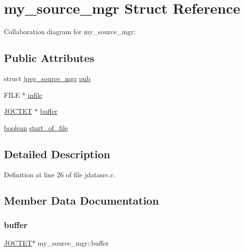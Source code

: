 \hypertarget{structmy__source__mgr}{}\section{my\+\_\+source\+\_\+mgr Struct Reference}
\label{structmy__source__mgr}


Collaboration diagram for my\+\_\+source\+\_\+mgr\+:
\subsection*{Public Attributes}
\begin{DoxyCompactItemize}
\item 
struct \mbox{\hyperlink{structjpeg__source__mgr}{jpeg\+\_\+source\+\_\+mgr}} \mbox{\hyperlink{structmy__source__mgr_a8572f33f87bec948592001edea12680f}{pub}}
\item 
F\+I\+LE $\ast$ \mbox{\hyperlink{structmy__source__mgr_a157a49dcdfd5723e566b1b8a35394a04}{infile}}
\item 
\mbox{\hyperlink{jmorecfg_8h_a356ad249f20e691b520da439f92cccbc}{J\+O\+C\+T\+ET}} $\ast$ \mbox{\hyperlink{structmy__source__mgr_ab92bf51a7ca44e0d3909aeb21fb0b0f8}{buffer}}
\item 
\mbox{\hyperlink{jmorecfg_8h_a7c6368b321bd9acd0149b030bb8275ed}{boolean}} \mbox{\hyperlink{structmy__source__mgr_a5c505c9008db53bb3ce07ed8ae3872a9}{start\+\_\+of\+\_\+file}}
\end{DoxyCompactItemize}


\subsection{Detailed Description}


Definition at line 26 of file jdatasrc.\+c.



\subsection{Member Data Documentation}
\mbox{\label{structmy__source__mgr_ab92bf51a7ca44e0d3909aeb21fb0b0f8}} 
\subsubsection{\texorpdfstring{buffer}{buffer}}
{\footnotesize\ttfamily \mbox{\hyperlink{jmorecfg_8h_a356ad249f20e691b520da439f92cccbc}{J\+O\+C\+T\+ET}}$\ast$ my\+\_\+source\+\_\+mgr\+::buffer}



